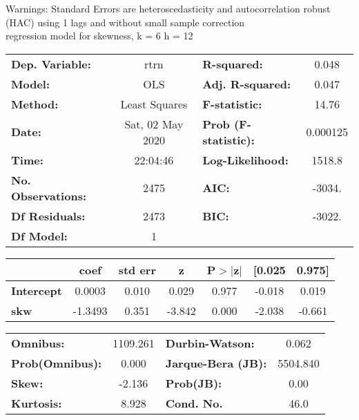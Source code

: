 Warnings: \newline
 [1] Standard Errors are heteroscedasticity and autocorrelation robust (HAC) using 1 lags and without small sample correction\\ 

regression model for skewness, k = 6 h = 12\begin{center}
\begin{tabular}{lclc}
\toprule
\textbf{Dep. Variable:}    &       rtrn       & \textbf{  R-squared:         } &     0.048   \\
\textbf{Model:}            &       OLS        & \textbf{  Adj. R-squared:    } &     0.047   \\
\textbf{Method:}           &  Least Squares   & \textbf{  F-statistic:       } &     14.76   \\
\textbf{Date:}             & Sat, 02 May 2020 & \textbf{  Prob (F-statistic):} &  0.000125   \\
\textbf{Time:}             &     22:04:46     & \textbf{  Log-Likelihood:    } &    1518.8   \\
\textbf{No. Observations:} &        2475      & \textbf{  AIC:               } &    -3034.   \\
\textbf{Df Residuals:}     &        2473      & \textbf{  BIC:               } &    -3022.   \\
\textbf{Df Model:}         &           1      & \textbf{                     } &             \\
\bottomrule
\end{tabular}
\begin{tabular}{lcccccc}
                   & \textbf{coef} & \textbf{std err} & \textbf{z} & \textbf{P$> |$z$|$} & \textbf{[0.025} & \textbf{0.975]}  \\
\midrule
\textbf{Intercept} &       0.0003  &        0.010     &     0.029  &         0.977        &       -0.018    &        0.019     \\
\textbf{skw}       &      -1.3493  &        0.351     &    -3.842  &         0.000        &       -2.038    &       -0.661     \\
\bottomrule
\end{tabular}
\begin{tabular}{lclc}
\textbf{Omnibus:}       & 1109.261 & \textbf{  Durbin-Watson:     } &    0.062  \\
\textbf{Prob(Omnibus):} &   0.000  & \textbf{  Jarque-Bera (JB):  } & 5504.840  \\
\textbf{Skew:}          &  -2.136  & \textbf{  Prob(JB):          } &     0.00  \\
\textbf{Kurtosis:}      &   8.928  & \textbf{  Cond. No.          } &     46.0  \\
\bottomrule
\end{tabular}
\end{center}

